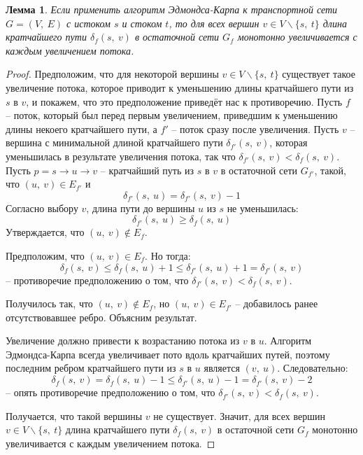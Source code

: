 \documentclass[a4paper,12pt]{article}
\newtheorem*{fulllemma}{Лемма}
\begin{document}
\begin{fulllemma}
Если применить алгоритм Эдмондса-Карпа к транспортной сети $G = (V,\ E)$ с истоком $s$ и стоком $t$, то для всех вершин $v \in V\backslash\{s,\ t\}$ длина кратчайшего пути $\delta_f(s,\ v)$ в остаточной сети $G_f$ монотонно увеличивается с каждым увеличением потока.
\end{fulllemma}
\begin{proof}
Предположим, что для некоторой вершины $v \in V\backslash\{s,\ t\}$ существует такое увеличение потока, которое приводит к уменьшению длины кратчайшего пути из $s$ в $v$, и покажем, что это предположение приведёт нас к противоречию. Пусть $f$ -- поток, который был перед первым увеличением, приведшим к уменьшению длины некоего кратчайшего пути, а $f'$ -- поток сразу после увеличения. Пусть $v$ -- вершина с минимальной длиной кратчайшего пути $\delta_{f'}(s,\ v)$, которая уменьшилась в результате увеличения потока, так что $\delta_{f'}(s,\ v) < \delta_f(s,\ v)$. Пусть $p = s \to u \to v$ -- кратчайший путь из $s$ в $v$ в остаточной сети $G_{f'}$, такой, что $(u,\ v) \in E_{f'}$  и \[\delta_{f'}(s,\ u) = \delta_{f'}(s,\ v) - 1\]
Согласно выбору $v$, длина пути до вершины $u$ из $s$ не уменьшилась:\[\delta_{f'}(s,\ u) \geqslant \delta_{f}(s,\ u)\]
Утверждается, что $(u,\ v) \notin E_f$.

Предположим, что $(u,\ v) \in E_f$. Но тогда: \[\delta_{f}(s,\ v) \leqslant \delta_{f}(s,\ u) + 1 \leqslant \delta_{f'}(s,\ u) + 1 = \delta_{f'}(s,\ v)\] -- противоречие предположению о том, что $\delta_{f'}(s,\ v) < \delta_f(s,\ v)$.

Получилось так, что $(u,\ v) \notin E_f$, но $(u,\ v) \in E_{f'}$ -- добавилось ранее отсутствовавшее ребро. Объясним результат.

Увеличение должно привести к возрастанию потока из $v$ в $u$. Алгоритм Эдмондса-Карпа всегда увеличивает пото вдоль кратчайших путей, поэтому последним ребром кратчайшего пути из $s$ в $u$ является $(v,\ u)$. Следовательно: \[\delta_{f}(s,\ v) = \delta_{f}(s,\ u) - 1 \leqslant \delta_{f'}(s,\ u) - 1 = \delta_{f'}(s,\ v) - 2\] -- опять противоречие предположению о том, что $\delta_{f'}(s,\ v) < \delta_f(s,\ v)$.

Получается, что такой вершины $v$ не существует. Значит, для всех вершин $v \in V\backslash\{s,\ t\}$ длина кратчайшего пути $\delta_f(s,\ v)$ в остаточной сети $G_f$ монотонно увеличивается с каждым увеличением потока.
\end{proof}
\end{document}
